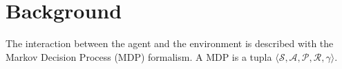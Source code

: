 \section{Background}


The interaction between the agent and the environment is described 
with the Markov Decision Process (MDP) formalism. A MDP is a tupla
$\langle \mathcal{S}, \mathcal{A}, \mathcal{P}, \mathcal{R}, \gamma \rangle$.